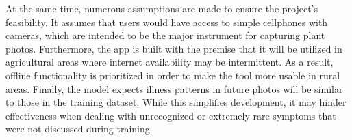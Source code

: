 At the same time, numerous assumptions are made to ensure the project's feasibility. It assumes that users would have access to simple cellphones with cameras, which are intended to be the major instrument for capturing plant photos. Furthermore, the app is built with the premise that it will be utilized in agricultural areas where internet availability may be intermittent. As a result, offline functionality is prioritized in order to make the tool more usable in rural areas. Finally, the model expects illness patterns in future photos will be similar to those in the training dataset. While this simplifies development, it may hinder effectiveness when dealing with unrecognized or extremely rare symptoms that were not discussed during training.

 

 